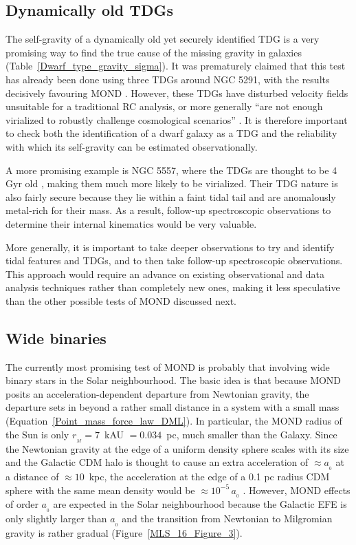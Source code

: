 \documentclass[fleqn,usenatbib,useAMS,onecolumn]{mnras} %
\begin{document}
\subsection{Dynamically old TDGs}
\label{Tidal_dwarf_galaxies_future}

The self-gravity of a dynamically old yet securely identified TDG is a very promising way to find the true cause of the missing gravity in galaxies (Table~\ref{Dwarf_type_gravity_sigma}). It was prematurely claimed that this test has already been done using three TDGs around NGC 5291, with the results decisively favouring MOND \citep{Bournaud_2007, Gentile_2007, Milgrom_2007}. However, these TDGs have disturbed velocity fields unsuitable for a traditional RC analysis, or more generally ``are not enough virialized to robustly challenge cosmological scenarios'' \citep{Flores_2016}. It is therefore important to check both the identification of a dwarf galaxy as a TDG and the reliability with which its self-gravity can be estimated observationally.

A more promising example is NGC 5557, where the TDGs are thought to be 4 Gyr old \citep{Duc_2014}, making them much more likely to be virialized. Their TDG nature is also fairly secure because they lie within a faint tidal tail and are anomalously metal-rich for their mass. As a result, follow-up spectroscopic observations to determine their internal kinematics would be very valuable.

More generally, it is important to take deeper observations to try and identify tidal features and TDGs, and to then take follow-up spectroscopic observations. This approach would require an advance on existing observational and data analysis techniques rather than completely new ones, making it less speculative than the other possible tests of MOND discussed next.



\subsection{Wide binaries}
\label{Wide_binaries}

The currently most promising test of MOND is probably that involving wide binary stars in the Solar neighbourhood. The basic idea is that because MOND posits an acceleration-dependent departure from Newtonian gravity, the departure sets in beyond a rather small distance in a system with a small mass (Equation~\ref{Point_mass_force_law_DML}). In particular, the MOND radius of the Sun is only $r_{_M} = 7$~kAU $= 0.034$~pc, much smaller than the Galaxy. Since the Newtonian gravity at the edge of a uniform density sphere scales with its size and the Galactic CDM halo is thought to cause an extra acceleration of $\approx a_{_0}$ at a distance of $\approx 10$~kpc, the acceleration at the edge of a 0.1 pc radius CDM sphere with the same mean density would be $\approx 10^{-5} \, a_{_0}$ \citep{Acedo_2020}. However, MOND effects of order $a_{_0}$ are expected in the Solar neighbourhood because the Galactic EFE is only slightly larger than $a_{_0}$ \citep{Klioner_2021} and the transition from Newtonian to Milgromian gravity is rather gradual (Figure~\ref{MLS_16_Figure_3}).
\end{document}
